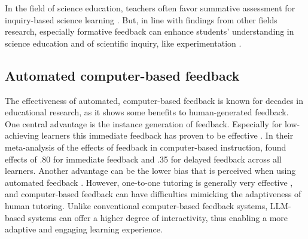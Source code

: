 In the field of science education, teachers often favor summative assessment for inquiry-based science learning \citep{grob2017formative, zlabkova2024development}. But, in line with findings from other fields research, especially formative feedback can enhance students' understanding in science education \citep{schultz2019effects} and of scientific inquiry, like experimentation \citep{grangeat2024introduction}. 




\subsection{Automated computer-based feedback} 

The effectiveness of automated, computer-based feedback is known for decades in educational research, as it shows some benefits to human-generated feedback. One central advantage is the instance generation of feedback. Especially for low-achieving learners this immediate feedback has proven to be effective \citep{mason2001providing}. In their meta-analysis of the effects of feedback in computer-based instruction, \citet{azevedo1995meta} found effects of .80 for immediate feedback and .35 for delayed feedback across all learners. 
Another advantage can be the lower bias that is perceived when using automated feedback \citep{kluger1996effects}. 
However, one-to-one tutoring is generally very effective \citep{bloom19842}, and computer-based feedback can have difficulties mimicking the adaptiveness of human tutoring.
Unlike conventional computer-based feedback systems, LLM-based systems can offer a higher degree of interactivity, thus enabling a more adaptive and engaging learning experience.





